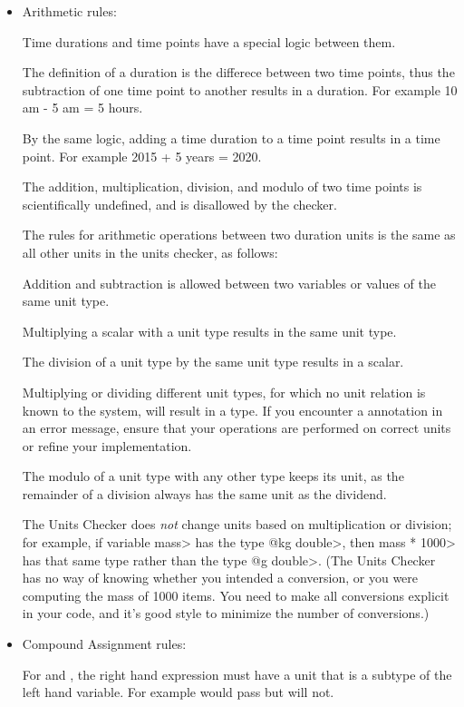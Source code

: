 \begin{itemize}
\item
Arithmetic rules:

Time durations and time points have a special logic between them.

The definition of a duration is the differece between two time points, thus
the subtraction of one time point to another results in a duration.
For example 10 am - 5 am = 5 hours.

By the same logic, adding a time duration to a time point results in a time
point. For example 2015 + 5 years = 2020.

The addition, multiplication, division, and modulo of two time points is
scientifically undefined, and is disallowed by the checker.

The rules for arithmetic operations between two duration units is the same as
all other units in the units checker, as follows:

Addition and subtraction is allowed between two variables or values of
the same unit type.

Multiplying a scalar with a unit type results in the same unit type.

The division of a unit type by the same unit type results in a scalar.

Multiplying or dividing different unit types, for which no unit
relation is known to the system, will result in a 
type.
If you encounter a  annotation in an error message,
ensure that your operations are performed on correct units or refine
your  implementation.

The modulo of a unit type with any other type keeps its unit, as the remainder
of a division always has the same unit as the dividend.

The Units Checker does \emph{not} change units based on multiplication or
division; for example, if variable \<mass> has the type \<@kg double>, then
\<mass * 1000> has that same type rather than the type \<@g double>. (The
Units Checker has no way of knowing whether you intended a conversion, or you
were computing the mass of 1000 items.  You need to make all conversions
explicit in your code, and it's good style to minimize the number of
conversions.)

\item
Compound Assignment rules:

For \code{+=} and \code{-=}, the right hand expression must have a unit that
is a subtype of the left hand variable. For example 
would pass but  will not.


\end{itemize}
